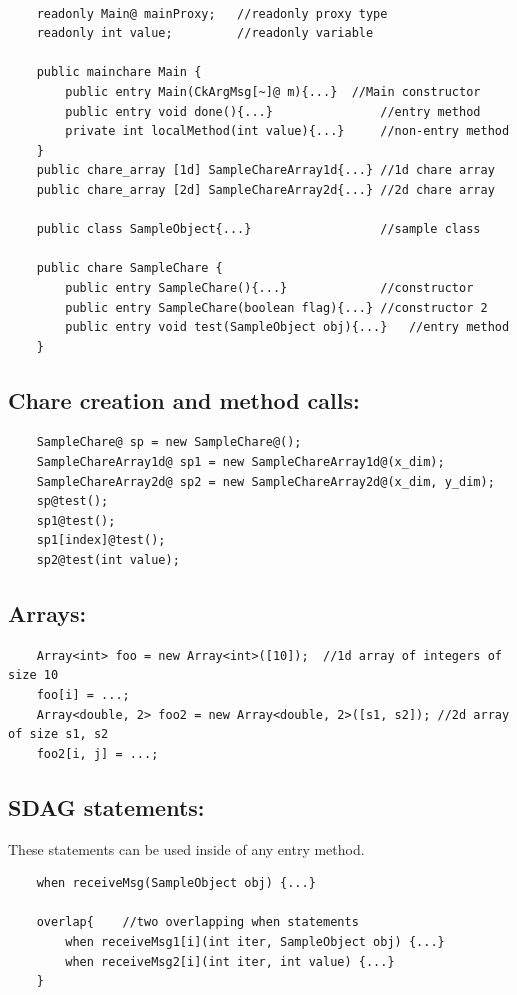 \documentclass[11pt]{article}
\begin{document}
\begin{verbatim}

	readonly Main@ mainProxy;	//readonly proxy type
	readonly int value;			//readonly variable
	
	public mainchare Main {
	    public entry Main(CkArgMsg[~]@ m){...} 	//Main constructor
	    public entry void done(){...}		    	//entry method 
	    private int localMethod(int value){...} 	//non-entry method
	}
	public chare_array [1d] SampleChareArray1d{...}	//1d chare array
	public chare_array [2d] SampleChareArray2d{...}	//2d chare array

	public class SampleObject{...}					//sample class

	public chare SampleChare {
	    public entry SampleChare(){...}				//constructor
	    public entry SampleChare(boolean flag){...}	//constructor 2
	    public entry void test(SampleObject obj){...}	//entry method
	}

\end{verbatim}

\subsection{Chare creation and method calls: }

\begin{verbatim}
	SampleChare@ sp = new SampleChare@();
	SampleChareArray1d@ sp1 = new SampleChareArray1d@(x_dim);
	SampleChareArray2d@ sp2 = new SampleChareArray2d@(x_dim, y_dim);
	sp@test();
	sp1@test();
	sp1[index]@test();
	sp2@test(int value);
\end{verbatim}

\subsection{Arrays:}

\begin{verbatim}
	Array<int> foo = new Array<int>([10]);  //1d array of integers of size 10
	foo[i] = ...;
	Array<double, 2> foo2 = new Array<double, 2>([s1, s2]); //2d array of size s1, s2
	foo2[i, j] = ...;
\end{verbatim}

\subsection{SDAG statements:}
These statements can be used inside of any entry method.

\begin{verbatim}
	when receiveMsg(SampleObject obj) {...}

	overlap{	//two overlapping when statements
		when receiveMsg1[i](int iter, SampleObject obj) {...}
		when receiveMsg2[i](int iter, int value) {...}
	}
\end{verbatim}
\end{document}
